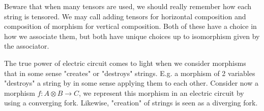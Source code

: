 \documentclass[../thesis.tex]{subfiles}
\begin{document}
            Beware that when many tensors are used, we should really remember how each string is tensored. We may call adding tensors for horizontal composition and composition of morphism for vertical composition. Both of these have a choice in how we associate them, but both have unique choices up to isomorphism given by the associator. 
            \begin{center}
            \end{center}

            The true power of electric circuit comes to light when we consider morphisms that in some sense "creates" or "destroys" strings. E.g. a morphism of 2 variables "destroys" a string by in some sense applying them to each other. Consider now a morphism $f : A \otimes B \rightarrow C$, we represent this morphism in an electric circuit by using a converging fork. Likewise, "creation" of strings is seen as a diverging fork.
            \begin{center}
            \end{center}
\end{document}
